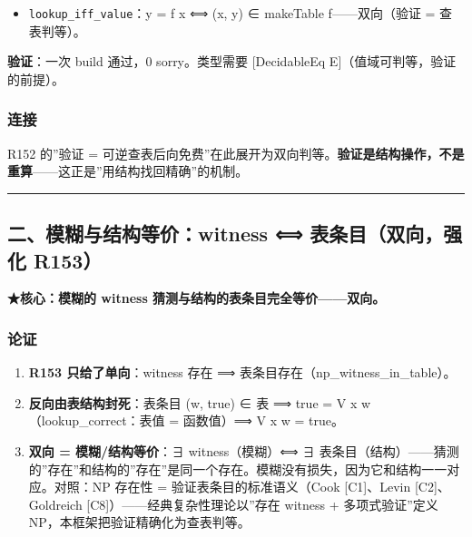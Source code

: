 \documentclass[
]{article}
\providecommand{\tightlist}{%
 \setlength{\itemsep}{0pt}\setlength{\parskip}{0pt}}
\begin{document}
\begin{itemize}
\tightlist
\item
 \texttt{lookup\_iff\_value}：y = f x ⟺ (x, y) ∈ makeTable
 f------双向（验证 = 查表判等）。
\end{itemize}

\textbf{验证}：一次 build 通过，0 sorry。类型需要 {[}DecidableEq
E{]}（值域可判等，验证的前提）。

\subsubsection{连接}\label{ux8fdeux63a5}

R152 的''验证 =
可逆查表后向免费''在此展开为双向判等。\textbf{验证是结构操作，不是重算}------这正是''用结构找回精确''的机制。

\begin{center}\rule{0.5\linewidth}{0.5pt}\end{center}

\subsection{二、模糊与结构等价：witness ⟺ 表条目（双向，强化
R153）}\label{ux4e8cux6a21ux7ccaux4e0eux7ed3ux6784ux7b49ux4ef7witness-ux8868ux6761ux76eeux53ccux5411ux5f3aux5316-r153}

\textbf{★核心：模糊的 witness 猜测与结构的表条目完全等价------双向。}

\subsubsection{论证}\label{ux8bbaux8bc1-1}

\begin{enumerate}
\def\labelenumi{\arabic{enumi}.}
\tightlist
\item
 \textbf{R153 只给了单向}：witness 存在 ⟹
 表条目存在（np\_witness\_in\_table）。
\item
 \textbf{反向由表结构封死}：表条目 (w, true) ∈ 表 ⟹ true = V x
 w（lookup\_correct：表值 = 函数值）⟹ V x w = true。
\item
 \textbf{双向 = 模糊/结构等价}：∃ witness（模糊）⟺ ∃
 表条目（结构）------猜测的''存在''和结构的''存在''是同一个存在。模糊没有损失，因为它和结构一一对应。对照：NP
 存在性 = 验证表条目的标准语义（Cook {[}C1{]}、Levin
 {[}C2{]}、Goldreich {[}C8{]}）------经典复杂性理论以''存在 witness +
 多项式验证''定义 NP，本框架把验证精确化为查表判等。
\end{enumerate}
\end{document}
